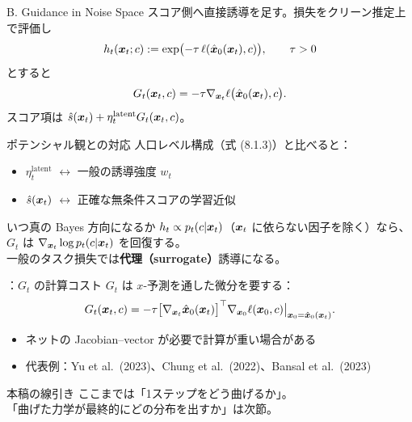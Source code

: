 \asmain
\begin{frame}{B. Guidance in Noise Space}
    スコア側へ直接誘導を足す。損失をクリーン推定上で評価し
    \[
        h_t(\bm{x}_t;c)
        :=
        \exp\bigl(-\tau\,\ell(\hat{\bm{x}}_0(\bm{x}_t),c)\bigr),
        \qquad \tau>0
    \]
    とすると
    \[
        G_t(\bm{x}_t,c)
        =
        -\tau\nabla_{\bm{x}_t}\ell\bigl(\hat{\bm{x}}_0(\bm{x}_t),c\bigr).
    \]
    スコア項は $\hat{s}(\bm{x}_t)+\eta_t^{\mathrm{latent}}G_t(\bm{x}_t,c)$。
\end{frame}
\asmain
\begin{frame}{ポテンシャル観との対応}
    人口レベル構成（式 (8.1.3)）と比べると：
    \begin{itemize}
        \item $\eta_t^{\mathrm{latent}}$ $\leftrightarrow$ 一般の誘導強度 $w_t$
        \item $\hat{s}(\bm{x}_t)$ $\leftrightarrow$ 正確な無条件スコアの学習近似
    \end{itemize}
    \begin{block}{いつ真の Bayes 方向になるか}
        $h_t\propto p_t(c|\bm{x}_t)$（$\bm{x}_t$ に依らない因子を除く）なら、\\
        $G_t$ は $\nabla_{\bm{x}_t}\log p_t(c|\bm{x}_t)$ を回復する。\\
        一般のタスク損失では\textbf{代理（surrogate）}誘導になる。
    \end{block}
\end{frame}
\assuppl
\begin{frame}{\supplmark：$G_t$ の計算コスト}
    $G_t$ は $x$-予測を通した微分を要する：
    \[
        G_t(\bm{x}_t,c)
        =
        -\tau
        \bigl[\nabla_{\bm{x}_t}\hat{\bm{x}}_0(\bm{x}_t)\bigr]^{\top}
        \nabla_{\bm{x}_0}\ell(\bm{x}_0,c)\big|_{\bm{x}_0=\hat{\bm{x}}_0(\bm{x}_t)}.
    \]
    \begin{itemize}
        \item ネットの Jacobian--vector が必要で計算が重い場合がある
        \item 代表例：Yu et al.\ (2023)、Chung et al.\ (2022)、Bansal et al.\ (2023)
    \end{itemize}
    \begin{alertblock}{本稿の線引き}
        ここまでは「1ステップをどう曲げるか」。\\
        「曲げた力学が最終的にどの分布を出すか」は次節。
    \end{alertblock}
\end{frame}
